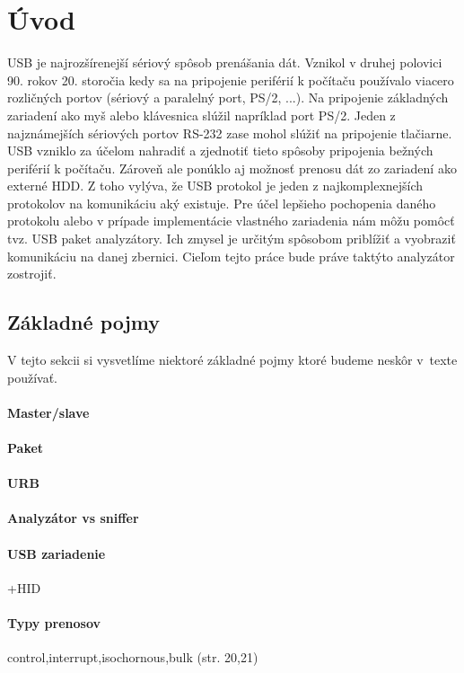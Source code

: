 \chapter{Úvod}

USB je najrozšírenejší sériový spôsob prenášania dát. Vznikol v druhej polovici 90. rokov 20. storočia kedy sa na pripojenie periférií k počítaču  používalo viacero rozličných portov (sériový a paralelný port, PS/2, ...). Na pripojenie základných zariadení ako myš alebo klávesnica slúžil napríklad port PS/2. Jeden z najznámejších sériových portov RS-232 zase mohol slúžiť na pripojenie tlačiarne. USB vzniklo za účelom nahradiť a zjednotiť tieto spôsoby pripojenia bežných periférií k počítaču. Zároveň ale ponúklo aj možnosť prenosu dát zo zariadení ako externé HDD. Z toho vylýva, že USB protokol je jeden z najkomplexnejších protokolov na komunikáciu aký existuje. Pre účel lepšieho pochopenia daného protokolu alebo v prípade implementácie vlastného zariadenia nám môžu pomôcť tvz. USB paket analyzátory. Ich zmysel je určitým spôsobom priblížiť a vyobraziť komunikáciu na danej zbernici. Cieľom tejto práce bude práve taktýto analyzátor zostrojiť.

\section{Základné pojmy}

V tejto sekcii si vysvetlíme niektoré základné pojmy ktoré budeme neskôr v~texte používať.

\subsubsection{Master/slave}
\subsubsection{Paket}
\subsubsection{URB}
\subsubsection{Analyzátor vs sniffer}
\subsubsection{USB zariadenie}
+HID
\subsubsection{Typy prenosov}
control,interrupt,isochornous,bulk (str. 20,21)

